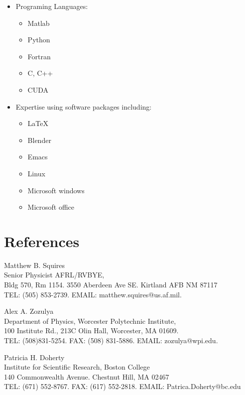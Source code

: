 \documentclass[overlapped,line,letterpaper]{res}
\begin{document}
\begin{resume}
\begin{itemize}
\item Programing Languages:
\begin{itemize}
\item Matlab
\item Python
\item Fortran
\item C, C++
\item CUDA
\end{itemize}

\item Expertise using software packages including:
\begin{itemize}
\item \LaTeX
\item Blender
\item Emacs
\item Linux
\item Microsoft windows
\item Microsoft office 
\end{itemize}

\end{itemize}



\section{\bf References}

\noindent
Matthew B. Squires \\
Senior Physicist AFRL/RVBYE, \\
Bldg 570, Rm 1154.
3550 Aberdeen Ave SE.
Kirtland AFB NM 87117
 \\
TEL: (505) 853-2739.  EMAIL: matthew.squires@us.af.mil.

\noindent
Alex A. Zozulya \\
Department of Physics, Worcester Polytechnic Institute, \\
100 Institute Rd., 213C Olin Hall, Worcester, MA 01609.  \\
TEL:  (508)831-5254.  FAX: (508) 831-5886.  EMAIL: zozulya@wpi.edu.

\noindent
Patricia H. Doherty \\
Institute for Scientific Research, Boston College\\
140 Commonwealth Avenue. Chestnut Hill, MA 02467 \\
TEL: (671) 552-8767.  FAX: (617) 552-2818.  EMAIL: Patrica.Doherty@bc.edu


 


\end{resume}
\end{document}
